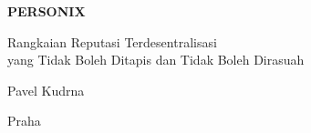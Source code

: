 \thispagestyle{empty}
\begin{center}
  {\sffamily\bfseries\fontsize{34}{40}\selectfont PERSONIX\par}
  \vspace{2.2em}
  {\rmfamily\large Rangkaian Reputasi Terdesentralisasi\\[0.25em]
   yang Tidak Boleh Ditapis dan Tidak Boleh Dirasuah\par}
\end{center}
\begin{center}
  {\rmfamily\Large Pavel Kudrna\par}
  \vspace{0.45em}
  {\rmfamily\small Praha\quad\textbullet{}\par}
\end{center}
\clearpage
